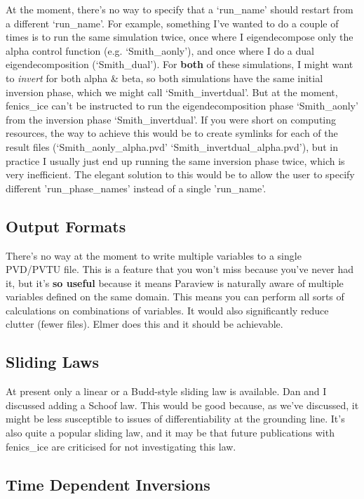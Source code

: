 \documentclass[11pt, reqno, nocenter]{article}
\begin{document}
At the moment, there's no way to specify that a `run\_name' should restart from a different `run\_name'. For example, something I've wanted to do a couple of times is to run the same simulation twice, once where I eigendecompose only the alpha control function (e.g. `Smith\_aonly'), and once where I do a dual eigendecomposition (`Smith\_dual'). For \textbf{both} of these simulations, I might want to \emph{invert} for both alpha \& beta, so both simulations have the same initial inversion phase, which we might call `Smith\_invertdual'. But at the moment, fenics\_ice can't be instructed to run the eigendecomposition phase `Smith\_aonly' from the inversion phase `Smith\_invertdual'. If you were short on computing resources, the way to achieve this would be to create symlinks for each of the result files (`Smith\_aonly\_alpha.pvd' \textrightarrow  `Smith\_invertdual\_alpha.pvd'), but in practice I usually just end up running the same inversion phase twice, which is very inefficient. The elegant solution to this would be to allow the user to specify different 'run\_phase\_names' instead of a single 'run\_name'.

\subsection{Output Formats}

There's no way at the moment to write multiple variables to a single PVD/PVTU file. This is a feature that you won't miss because you've never had it, but it's \textbf{so useful} because it means Paraview is naturally aware of multiple variables defined on the same domain. This means you can perform all sorts of calculations on combinations of variables. It would also significantly reduce clutter (fewer files). Elmer does this and it should be achievable.

\subsection{Sliding Laws}

At present only a linear or a Budd-style sliding law is available. Dan and I discussed adding a Schoof law. This would be good because, as we've discussed, it might be less susceptible to issues of differentiability at the grounding line. It's also quite a popular sliding law, and it may be that future publications with fenics\_ice are criticised for not investigating this law.

\subsection{Time Dependent Inversions}
\end{document}
